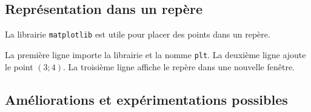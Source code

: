 \begin{figure}[h]
\end{figure}


\subsection*{Représentation dans un repère}

La librairie \texttt{matplotlib} est utile pour placer des points dans un repère.

\begin{multicols}{2}
	La première ligne importe la librairie et la nomme \texttt{plt}.
	La deuxième ligne ajoute le point $(3 ; 4)$.
	La troisième ligne affiche le repère dans une nouvelle fenêtre.
	
	\columnbreak
	\centering
	\begin{minipage}{.3\textwidth}
	\end{minipage}
\end{multicols}

\subsection*{Améliorations et expérimentations possibles}

